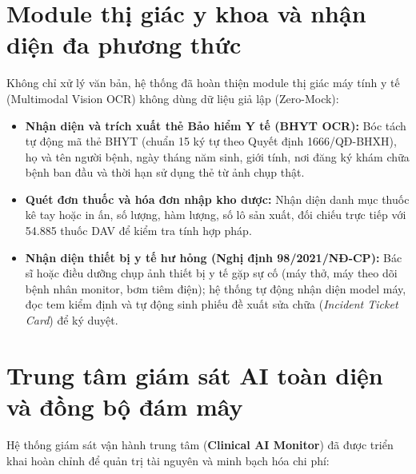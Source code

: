 \documentclass[12pt,a4paper]{article}
\begin{document}
\section{Module thị giác y khoa và nhận diện đa phương thức}

Không chỉ xử lý văn bản, hệ thống đã hoàn thiện module thị giác máy tính y tế (Multimodal Vision OCR) không dùng dữ liệu giả lập (Zero-Mock):

\begin{itemize}[leftmargin=1.5em]
    \item \textbf{Nhận diện và trích xuất thẻ Bảo hiểm Y tế (BHYT OCR):} Bóc tách tự động mã thẻ BHYT (chuẩn 15 ký tự theo Quyết định 1666/QĐ-BHXH), họ và tên người bệnh, ngày tháng năm sinh, giới tính, nơi đăng ký khám chữa bệnh ban đầu và thời hạn sử dụng thẻ từ ảnh chụp thật.
    \item \textbf{Quét đơn thuốc và hóa đơn nhập kho dược:} Nhận diện danh mục thuốc kê tay hoặc in ấn, số lượng, hàm lượng, số lô sản xuất, đối chiếu trực tiếp với 54.885 thuốc DAV để kiểm tra tính hợp pháp.
    \item \textbf{Nhận diện thiết bị y tế hư hỏng (Nghị định 98/2021/NĐ-CP):} Bác sĩ hoặc điều dưỡng chụp ảnh thiết bị y tế gặp sự cố (máy thở, máy theo dõi bệnh nhân monitor, bơm tiêm điện); hệ thống tự động nhận diện model máy, đọc tem kiểm định và tự động sinh phiếu đề xuất sửa chữa (\textit{Incident Ticket Card}) để ký duyệt.
\end{itemize}

\section{Trung tâm giám sát AI toàn diện và đồng bộ đám mây}

Hệ thống giám sát vận hành trung tâm (\textbf{Clinical AI Monitor}) đã được triển khai hoàn chỉnh để quản trị tài nguyên và minh bạch hóa chi phí:
\end{document}
